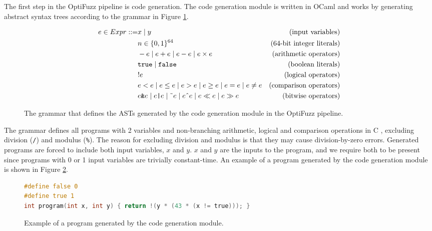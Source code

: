 The first step in the OptiFuzz pipeline is code generation. 
The code generation module is written in OCaml and works by generating abstract syntax trees according to the grammar in Figure \ref{fig:grammar}.

\begin{figure}[H]
  \centering
  \begin{align*}
    e \in Expr ::= & x \mid y &\text{(input variables)}\\
    & n \in \{0, 1\}^{64} &\text{(64-bit integer literals)}\\
    & -e \mid e + e \mid e - e \mid e \times e &\text{(arithmetic operators)}\\
    & \texttt{true} \mid \texttt{false} &\text{(boolean literals)}\\
    & !e &\text{(logical operators)}\\
    & e < e \mid e \leq e \mid e > e \mid e \geq e \mid e = e \mid e \neq e &\text{(comparison operators)}\\
    & e \texttt{\&} e \mid e \texttt{|} e \mid \text{\~{}} e \mid e \text{\^{}} e \mid e \ll e \mid e \gg e &\text{(bitwise operators)}
  \end{align*}
  \caption{The grammar that defines the ASTs generated by the code generation module in the OptiFuzz pipeline.}
  \label{fig:grammar}
\end{figure}

The grammar defines all programs with 2 variables and non-branching arithmetic, logical and comparison operations in C \citep{c-standard}, excluding division (\texttt{/}) and modulus (\texttt{\%}).
The reason for excluding division and modulus is that they may cause division-by-zero errors.
Generated programs are forced to include both input variables, $x$ and $y$.
$x$ and $y$ are the inputs to the program, and we require both to be present since programs with 0 or 1 input variables are trivially constant-time.
An example of a program generated by the code generation module is shown in Figure \ref{fig:code-gen-example}.

\begin{figure}[H]
  \begin{lstlisting}[style=defstyle,language=C, xleftmargin=2.7cm, xrightmargin=2.7cm]
#define false 0
#define true 1
int program(int x, int y) { return !(y * (43 * (x != true))); } \end{lstlisting}
  \caption{Example of a program generated by the code generation module.}
  \label{fig:code-gen-example}
\end{figure}

